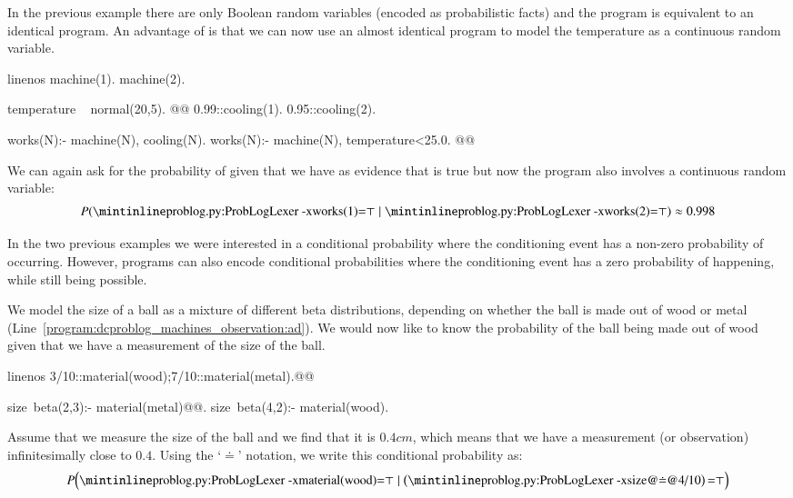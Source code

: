 \begin{example}\label{example:dcproblog_machine}
In the previous example there are only Boolean random variables (encoded as probabilistic facts) and the \dcproblogsty program is equivalent to an identical \problogsty program. An advantage of \dcproblogsty is that we can now use an almost identical program to model the temperature as a continuous random variable.

	\begin{problog*}{linenos}
machine(1). machine(2).

temperature ~ normal(20,5). @\label{program:dcproblog_machines_temp}@
0.99::cooling(1).
0.95::cooling(2).

works(N):- machine(N), cooling(N).
works(N):- machine(N), temperature<25.0. @\label{program:dcproblog_machines_work_temp}@
	\end{problog*}
We can again ask for the probability of  given that we have as evidence that  is true but now the program also involves a continuous random variable:
$$
P(\text{\probloginline{works(1)}}{=}\top\mid\text{\probloginline{works(2)}}{=}\top)\approx 0.998
$$
\end{example}

In the two previous examples we were interested in a conditional probability where the conditioning event has a non-zero probability of occurring. However, \dcproblogsty programs can also encode conditional probabilities where the conditioning event has a zero probability of happening, while still being possible.
\begin{example}\label{example:dcproblog:observation}
	We model the size of a ball as a mixture of  different beta distributions, depending on whether the ball is made out of wood or metal (Line~\ref{program:dcproblog_machines_observation:ad}).
	We would now like to know the probability of the ball being made out of wood given that we have a measurement of the size of the ball.
	\begin{problog*}{linenos}
3/10::material(wood);7/10::material(metal).@\label{program:dcproblog_machines_observation:ad}@

size~beta(2,3):- material(metal)@\label{example:dcproblog:observation:beta23}@.
size~beta(4,2):- material(wood).
	\end{problog*}
Assume that we measure the size of the ball and we find that it is $0.4cm$, which means that we have a measurement (or observation) infinitesimally close to $0.4$. Using the `$\doteq$' notation, we write this conditional probability as:
	\begin{align}
		P\Bigl(\text{\probloginline{material(wood)}}{=}\top \mid \left(\text{\probloginline{size@$\doteq$@4/10}}\right) {=}\top \Bigr)
	\end{align}
\end{example}



